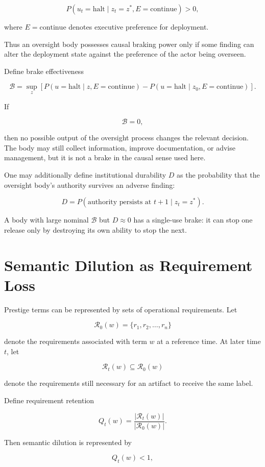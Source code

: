 \documentclass[11pt]{article}
\begin{document}
\[
P(u_t=\text{halt}\mid z_t=z^*,E=\text{continue})>0,
\]

where \(E=\text{continue}\) denotes executive preference for deployment.

Thus an oversight body possesses causal braking power only if some finding
can alter the deployment state against the preference of the actor being
overseen.

Define brake effectiveness

\[
\mathcal B
=
\sup_{z}
\left[
P(u=\text{halt}\mid z,E=\text{continue})
-
P(u=\text{halt}\mid z_0,E=\text{continue})
\right].
\]

If

\[
\mathcal B=0,
\]

then no possible output of the oversight process changes the relevant
decision. The body may still collect information, improve documentation, or
advise management, but it is not a brake in the causal sense used here.

One may additionally define institutional durability \(D\) as the probability
that the oversight body's authority survives an adverse finding:

\[
D
=
P(\text{authority persists at }t+1
\mid z_t=z^*).
\]

A body with large nominal \(\mathcal B\) but \(D\approx0\) has a
single-use brake: it can stop one release only by destroying its own ability
to stop the next.


\section{Semantic Dilution as Requirement Loss}

Prestige terms can be represented by sets of operational requirements.
Let

\[
\mathcal R_0(w)
=
\{r_1,r_2,\ldots,r_n\}
\]

denote the requirements associated with term \(w\) at a reference time. At
later time \(t\), let

\[
\mathcal R_t(w)\subseteq\mathcal R_0(w)
\]

denote the requirements still necessary for an artifact to receive the same
label.

Define requirement retention

\[
Q_t(w)
=
\frac{|\mathcal R_t(w)|}
{|\mathcal R_0(w)|}.
\]

Then semantic dilution is represented by

\[
Q_t(w)<1,
\]
\end{document}
